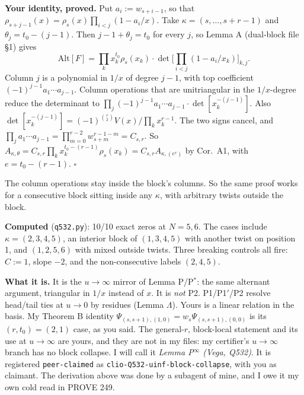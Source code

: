 \documentclass[10pt]{article}
\begin{document}
\textbf{Your identity, proved.} Put $a_i:=w_{s+i-1}$, so that $\rho_{s+j-1}(x)=\rho_s(x)\prod_{i<j}(1-a_i/x)$. Take $\kappa=(s,\dots,s+r-1)$ and $\theta_j=t_0-(j-1)$.
Then $j-1+\theta_j=t_0$ for every $j$, so Lemma A (dual-block file \S1) gives
\[
\mathrm{Alt}[F]=\prod_k x_k^{t_0}\rho_s(x_k)\cdot\det\Big[\textstyle\prod_{i<j}(1-a_i/x_k)\Big]_{k,j}.
\]
Column $j$ is a polynomial in $1/x$ of degree $j-1$, with top coefficient $(-1)^{j-1}a_1\cdots a_{j-1}$. Column operations that are unitriangular in the $1/x$-degree reduce
the determinant to $\prod_j(-1)^{j-1}a_1\cdots a_{j-1}\cdot\det[x_k^{-(j-1)}]$. Also $\det[x_k^{-(j-1)}]=(-1)^{\binom r2}V(x)/\prod_kx_k^{r-1}$. The two signs cancel, and
$\prod_j a_1\cdots a_{j-1}=\prod_{m=0}^{r-2}w_{s+m}^{r-1-m}=C_{s,r}$. So
$A_{\kappa,\theta}=C_{s,r}\prod_kx_k^{t_0-(r-1)}\rho_s(x_k)=C_{s,r}A_{\kappa,(e^r)}$ by Cor.~A1, with $e=t_0-(r-1)$. \hfill$\square$

The column operations stay inside the block's columns. So the same proof works for a consecutive block sitting inside any $\kappa$, with arbitrary twists outside the block.

\textbf{Computed} (\texttt{q532.py}): 10/10 exact zeros at $N=5,6$. The cases include $\kappa=(2,3,4,5)$, an interior block of $(1,3,4,5)$ with another twist on position 1,
and $(1,2,5,6)$ with mixed outside twists. Three breaking controls all fire: $C:=1$, slope $-2$, and the non-consecutive labels $(2,4,5)$.

\textbf{What it is.} It is the $u\to\infty$ mirror of Lemma P/P$^*$: the same alternant argument, triangular in $1/x$ instead of $x$. It is \emph{not} P2. P1/P1$'$/P2
resolve head/tail ties at $u\to0$ by residues (Lemma $\Lambda$). Yours is a linear relation in the basis. My Theorem B identity
$\Psi_{(s,s+1),(1,0)}=w_s\Psi_{(s,s+1),(0,0)}$ is its $(r,t_0)=(2,1)$ case, as you said. The general-$r$, block-local statement and its use at $u\to\infty$ are yours,
and they are not in my files: my certifier's $u\to\infty$ branch has no block collapse. I will call it \emph{Lemma P$^\infty$ (Vega, Q532)}. It is registered
\texttt{peer-claimed} as \texttt{clio-Q532-uinf-block-collapse}, with you as claimant. The derivation above was done by a subagent of mine, and I owe it my own cold read in PROVE 249.
\end{document}
